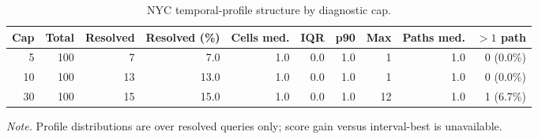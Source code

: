 \begin{table}[t]
\centering
\caption{NYC temporal-profile structure by diagnostic cap.}
\begin{tabular}{rrrrrrrrrr}
\toprule
Cap & Total & Resolved & Resolved (\%) & Cells med. & IQR & p90 & Max & Paths med. & $>1$ path \\
\midrule
5 & 100 & 7 & 7.0 & 1.0 & 0.0 & 1.0 & 1 & 1.0 & 0 (0.0\%) \\
10 & 100 & 13 & 13.0 & 1.0 & 0.0 & 1.0 & 1 & 1.0 & 0 (0.0\%) \\
30 & 100 & 15 & 15.0 & 1.0 & 0.0 & 1.0 & 12 & 1.0 & 1 (6.7\%) \\
\bottomrule
\end{tabular}
\end{table}
\textit{Note.} Profile distributions are over resolved queries only; score gain versus interval-best is unavailable.
